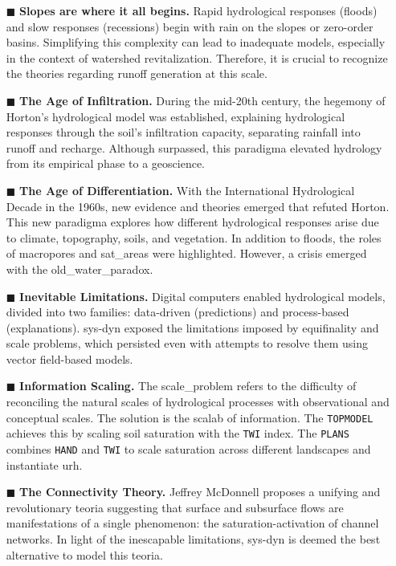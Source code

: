 \documentclass[./main_en.tex]{subfiles}
\begin{document}
\begin{itemize}
    \item[$\blacksquare$] \textbf{Slopes are where it all begins.} Rapid hydrological responses (floods) and slow responses (recessions) begin with rain on the slopes or zero-order basins. Simplifying this complexity can lead to inadequate models, especially in the context of watershed revitalization. Therefore, it is crucial to recognize the theories regarding runoff generation at this scale.
    
    \item[$\blacksquare$] \textbf{The Age of Infiltration.} During the mid-20th century, the hegemony of Horton’s hydrological model was established, explaining hydrological responses through the soil's infiltration capacity, separating rainfall into runoff and recharge. Although surpassed, this \gls{paradigma} elevated \gls{hydrology} from its empirical phase to a geoscience.

    \item[$\blacksquare$] \textbf{The Age of Differentiation.} With the International Hydrological Decade in the 1960s, new evidence and theories emerged that refuted Horton. This new \gls{paradigma} explores how different hydrological responses arise due to climate, topography, soils, and vegetation. In addition to floods, the roles of macropores and \gls{sat_areas} were highlighted. However, a crisis emerged with the \gls{old_water_paradox}.
    
    \item[$\blacksquare$] \textbf{Inevitable Limitations.} Digital computers enabled hydrological models, divided into two families: data-driven (predictions) and process-based (explanations). \gls{sys-dyn} exposed the limitations imposed by equifinality and scale problems, which persisted even with attempts to resolve them using vector field-based models.
    
    \item[$\blacksquare$] \textbf{Information Scaling.} The \gls{scale_problem} refers to the difficulty of reconciling the natural scales of hydrological processes with observational and conceptual scales. The solution is the \gls{scalab} of information. The \texttt{TOPMODEL} achieves this by scaling soil saturation with the \texttt{TWI} index. The \texttt{PLANS} combines \texttt{HAND} and \texttt{TWI} to scale saturation across different landscapes and instantiate \gls{urh}.
    
    \item[$\blacksquare$] \textbf{The Connectivity Theory.} Jeffrey McDonnell proposes a unifying and revolutionary \gls{teoria} suggesting that surface and subsurface flows are manifestations of a single phenomenon: the saturation-activation of channel networks. In light of the inescapable limitations, \gls{sys-dyn} is deemed the best alternative to model this \gls{teoria}.
    
\end{itemize}
\end{document}
